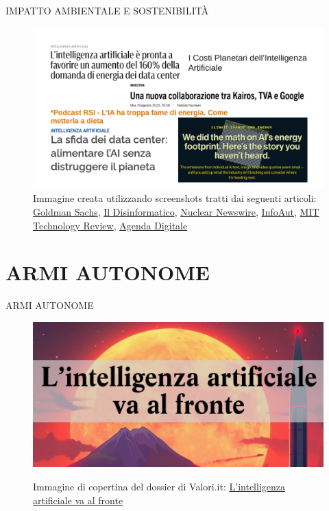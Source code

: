 \documentclass[aspectratio=1610]{beamer}
\begin{document}
\begin{frame}{IMPATTO AMBIENTALE E SOSTENIBILITÀ}
    \begin{figure}
        \includegraphics[width=.9\linewidth]{img/inquinamentoAI.png}
        \caption{
            Immagine creata utilizzando screenshots tratti dai seguenti articoli:
            \href{https://www.goldmansachs.com/insights/articles/AI-poised-to-drive-160-increase-in-power-demand}{Goldman Sachs}, 
            \href{https://attivissimo.blogspot.com/2024/08/anteprima-podcast-rsi-lia-ha-troppa.html}{Il Disinformatico}, 
            \href{https://www.ans.org/news/article-7291/a-new-collaboration-among-kairos-tva-and-google/}{Nuclear Newswire}, 
            \href{https://infoaut.org/approfondimenti/i-costi-planetari-dellintelligenza-artificiale}{InfoAut}, 
            \href{https://www.technologyreview.com/2025/05/20/1116327/ai-energy-usage-climate-footprint-big-tech/}{MIT Technology Review}, 
            \href{https://www.agendadigitale.eu/smart-city/la-sfida-dei-data-center-alimentare-lai-senza-distruggere-il-pianeta/}{Agenda Digitale}
        }
    \end{figure}
\end{frame}

\section{ARMI AUTONOME}

\begin{frame}{ARMI AUTONOME}
    \begin{figure}
        \href{https://valori.it/wp-content/uploads/2024/04/Lintelligenza-artificiale-va-al-fronte.pdf}{\includegraphics[width=.9\linewidth]{img/armiAutonome.png}}
        \caption{
            Immagine di copertina del dossier di Valori.it: 
            \href{https://valori.it/wp-content/uploads/2024/04/Lintelligenza-artificiale-va-al-fronte.pdf}{L’intelligenza artificiale va al fronte}
        }
    \end{figure}
\end{frame}
\end{document}
